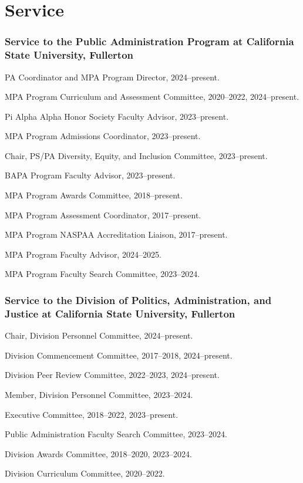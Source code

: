 \documentclass[12pt,letterpaper]{article}
\renewenvironment{itemize}{
  \begin{list}{}{
    \setlength{\leftmargin}{1.5em}
    \setlength{\itemsep}{0.25em}
    \setlength{\parskip}{0pt}
    \setlength{\parsep}{0.25em}
  }
}{
  \end{list}
}
\begin{document}
\section*{Service}

\subsubsection*{Service to the Public Administration Program at California State University, Fullerton}
\begin{itemize}\leftmargin=2pt\itemindent=-15pt
  \item PA Coordinator and MPA Program Director, 2024--present.
  \item MPA Program Curriculum and Assessment Committee, 2020--2022, 2024--present.
  \item Pi Alpha Alpha Honor Society Faculty Advisor, 2023--present.
  \item MPA Program Admissions Coordinator, 2023--present.
  \item Chair, PS/PA Diversity, Equity, and Inclusion Committee, 2023--present.
  \item BAPA Program Faculty Advisor, 2023--present.
  \item MPA Program Awards Committee, 2018--present.
  \item MPA Program Assessment Coordinator, 2017--present.
  \item MPA Program NASPAA Accreditation Liaison, 2017--present.
  \item MPA Program Faculty Advisor, 2024--2025.
  \item MPA Program Faculty Search Committee, 2023--2024.

\end{itemize}
\subsubsection*{Service to the Division of Politics, Administration, and Justice at California State University, Fullerton}
\begin{itemize}\leftmargin=2pt\itemindent=-15pt
  \item Chair, Division Personnel Committee, 2024--present.
  \item Division Commencement Committee, 2017--2018, 2024--present.
  \item Division Peer Review Committee, 2022--2023, 2024--present.
  \item Member, Division Personnel Committee, 2023--2024. 
  \item Executive Committee, 2018--2022, 2023--present.
  \item Public Administration Faculty Search Committee, 2023--2024.
  \item Division Awards Committee, 2018--2020, 2023--2024.
  \item Division Curriculum Committee, 2020--2022.
\end{itemize}
\end{document}
